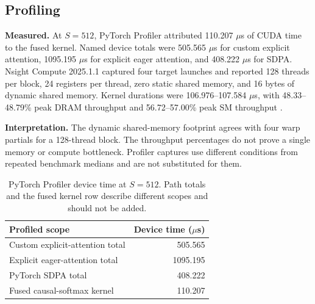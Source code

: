 \documentclass[twoside,twocolumn,10pt]{article}
\begin{document}
\subsection{Profiling}

\textbf{Measured.} At $S=512$, PyTorch Profiler attributed 110.207 $\mu$s of
CUDA time to the fused kernel. Named device totals were 505.565 $\mu$s for
custom explicit attention, 1095.195 $\mu$s for explicit eager attention, and
408.222 $\mu$s for SDPA. Nsight Compute 2025.1.1 captured four target launches
and reported 128 threads per block, 24 registers per thread, zero static shared
memory, and 16 bytes of dynamic shared memory. Kernel durations were
106.976--107.584 $\mu$s, with 48.33--48.79\% peak DRAM throughput and
56.72--57.00\% peak SM throughput \cite{pytorch_profiler,nsight_compute}.

\textbf{Interpretation.} The dynamic shared-memory footprint agrees with four
warp partials for a 128-thread block. The throughput percentages do not prove a
single memory or compute bottleneck. Profiler captures use different conditions
from repeated benchmark medians and are not substituted for them.

\begin{table}[t]
\centering
\caption{PyTorch Profiler device time at $S=512$. Path totals and the fused
kernel row describe different scopes and should not be added.}
\label{tab:profiler}
\begin{tabular}{L{4.4cm}r}
\toprule
Profiled scope & Device time ($\mu$s) \\
\midrule
Custom explicit-attention total & 505.565 \\
Explicit eager-attention total & 1095.195 \\
PyTorch SDPA total & 408.222 \\
Fused causal-softmax kernel & 110.207 \\
\bottomrule
\end{tabular}
\end{table}
\end{document}
